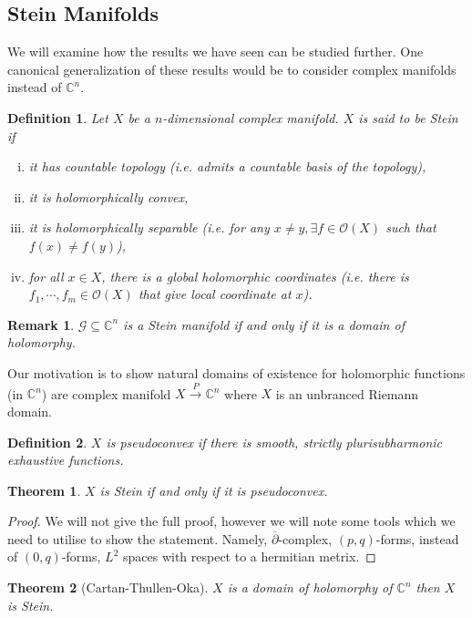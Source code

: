 \documentclass{article}
\newtheorem{theorem}{Theorem} [section]
\newtheorem{definition}{Definition}[section]
\newtheorem{remark}{Remark}[section]
\newcommand{\C}[0]{\mathbb{C}}
\newcommand{\G}[0]{\mathcal{G}}
\newcommand{\cbd}[0]{\overline{\partial}}
\newcommand{\Ouv}[0]{\mathcal{O}}
\begin{document}
    \subsection{Stein Manifolds}
    We will examine how the results we have seen can be studied further. One canonical generalization of these results would be to consider complex manifolds instead of $\C^n$. 
    \begin{definition}
      Let $X$ be a $n$-dimensional complex manifold. $X$ is said to be Stein if 
      \begin{enumerate}[i).]
        \item it has countable topology (i.e. admits a countable basis of the topology),
        \item it is holomorphically convex,
        \item it is holomorphically separable (i.e. for any $x\not=y,\exists f\in\Ouv(X)$ such that $f(x)\not=f(y)$),
        \item for all $x\in X$, there is a global holomorphic coordinates (i.e. there is $f_1,\cdots,f_m\in\Ouv(X)$ that give local coordinate at $x$).
      \end{enumerate}
    \end{definition}
    \begin{remark}
      $\G\subseteq\C^n$ is a Stein manifold if and only if it is a domain of holomorphy.
    \end{remark}
    Our motivation is to show natural domains of existence for holomorphic functions (in $\C^n$) are complex manifold $X\stackrel{P}{\to}\C^n$ where $X$ is an unbranced Riemann domain.
    \begin{definition}
      $X$ is pseudoconvex if there is smooth, strictly plurisubharmonic exhaustive functions.
    \end{definition}
    \begin{theorem}
      $X$ is Stein if and only if it is pseudoconvex.
    \end{theorem}
    \begin{proof}
      We will not give the full proof, however we will note some tools which we need to utilise to show the statement. Namely, $\cbd$-complex, $(p,q)$-forms, instead of $(0,q)$-forms, $L^2$ spaces with respect to a hermitian metrix.
    \end{proof}
    \begin{theorem}[Cartan-Thullen-Oka]
      $X$ is a domain of holomorphy of $\C^n$ then $X$ is Stein.
    \end{theorem}
\end{document}
